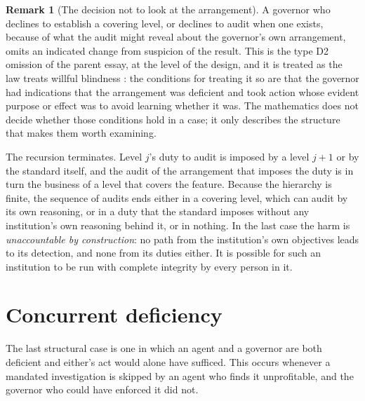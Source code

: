 \documentclass[11pt]{article}
\theoremstyle{plain}
\theoremstyle{definition}
\newtheorem{remark}{Remark}
\begin{document}
\begin{remark}[The decision not to look at the arrangement]\label{rem:d2design}
A governor who declines to establish a covering level, or declines to audit when one exists, because of what the audit might reveal about the governor's own arrangement, omits an indicated change from suspicion of the result. This is the type D2 omission of the parent essay, at the level of the design, and it is treated as the law treats willful blindness \cite{flyxion2026law}: the conditions for treating it so are that the governor had indications that the arrangement was deficient and took action whose evident purpose or effect was to avoid learning whether it was. The mathematics does not decide whether those conditions hold in a case; it only describes the structure that makes them worth examining.
\end{remark}

The recursion terminates. Level $j$'s duty to audit is imposed by a level $j+1$ or by the standard itself, and the audit of the arrangement that imposes the duty is in turn the business of a level that covers the feature. Because the hierarchy is finite, the sequence of audits ends either in a covering level, which can audit by its own reasoning, or in a duty that the standard imposes without any institution's own reasoning behind it, or in nothing. In the last case the harm is \emph{unaccountable by construction}: no path from the institution's own objectives leads to its detection, and none from its duties either. It is possible for such an institution to be run with complete integrity by every person in it.

\section{Concurrent deficiency}\label{sec:concurrent}

The last structural case is one in which an agent and a governor are both deficient and either's act would alone have sufficed. This occurs whenever a mandated investigation is skipped by an agent who finds it unprofitable, and the governor who could have enforced it did not.
\end{document}
